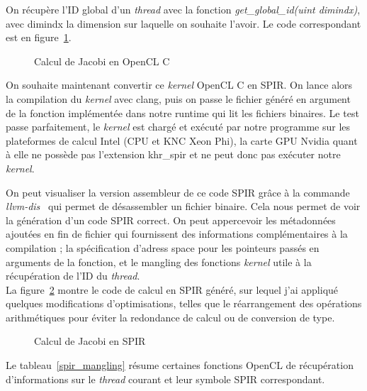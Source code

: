 On récupère l'ID global d'un \emph{thread} avec la fonction
\emph{get\_global\_id(uint dimindx)}, avec dimindx la dimension sur laquelle on
souhaite l'avoir. Le code correspondant est en figure~\ref{jacobi_calc_ocl_kernel}.

\begin{figure}[h]
   
   \caption{Calcul de Jacobi en OpenCL C}
   \label{jacobi_calc_ocl_kernel}
\end{figure}

On souhaite maintenant convertir ce \emph{kernel} OpenCL C en SPIR. On lance
alors la compilation du \emph{kernel} avec clang, puis on passe le fichier
généré en argument de la fonction implémentée dans notre runtime qui lit les
fichiers binaires. Le test passe parfaitement, le \emph{kernel} est chargé et
exécuté par notre programme sur les plateformes de calcul Intel (CPU et KNC Xeon
Phi), la carte GPU Nvidia quant à elle ne possède pas l'extension khr\_spir et
ne peut donc pas exécuter notre \emph{kernel}.

On peut visualiser la version assembleur de ce code SPIR grâce à la commande
\emph{llvm-dis}~\cite{llvm_cmd} qui permet de désassembler un fichier binaire.
Cela nous permet de voir la génération d'un code SPIR correct. On peut
appercevoir les métadonnées ajoutées en fin de fichier qui fournissent des
informations complémentaires à la compilation ; la spécification d'adress space
pour les pointeurs passés en arguments de la fonction, et le mangling des
fonctions \emph{kernel} utile à la récupération de l'ID du \emph{thread}.\\
La figure~\ref{jacobi_calc_spir_kernel} montre le code de calcul en SPIR généré,
sur lequel j'ai appliqué quelques modifications d'optimisations, telles que le
réarrangement des opérations arithmétiques pour éviter la redondance de calcul
ou de conversion de type.

\clearpage
{}
\begin{figure}[h!]
   
   \caption{Calcul de Jacobi en SPIR}
   \label{jacobi_calc_spir_kernel}
\end{figure}
\clearpage

Le tableau~\ref{spir_mangling} résume certaines fonctions OpenCL de récupération
d'informations sur le \emph{thread} courant et leur symbole SPIR correspondant.

